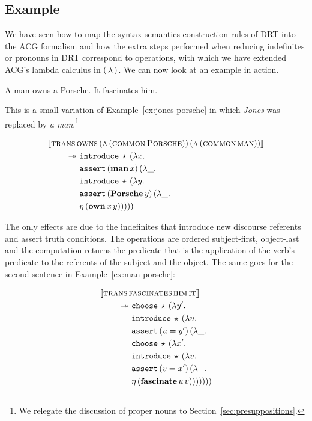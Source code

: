 \subsection{Example}
\label{ssec:dynamic-example}

We have seen how to map the syntax-semantics construction rules of DRT into
the ACG formalism and how the extra steps performed when reducing
indefinites or pronouns in DRT correspond to operations, with which we have
extended ACG's lambda calculus in $\llparenthesis \, \lambda \, \rrparenthesis$. We can now look at an
example in action.

\begin{exe}
  \ex \label{ex:man-porsche} A man owns a Porsche. It fascinates him.
\end{exe}

This is a small variation of Example~\ref{ex:jones-porsche} in which
\emph{Jones} was replaced by \emph{a man}.\footnote{We relegate the
  discussion of proper nouns to Section~\ref{sec:presuppositions}.}

\begin{align*}
  \llbracket \textsc{trans}\,&\textsc{owns}\,(\textsc{a}\,(\textsc{common}\,\textsc{Porsche}))\,(\textsc{a}\,(\textsc{common}\,\textsc{man})) \rrbracket \\
  \twoheadrightarrow &\ \mathtt{introduce}\,\star\,(\lambda x.\,  \\
       &\ \mathtt{assert}\,(\textbf{man}\,x)\,(\lambda \_.\,  \\
       &\ \mathtt{introduce}\,\star\,(\lambda y.\,  \\
       &\ \mathtt{assert}\,(\textbf{Porsche}\,y)\,(\lambda \_.\,  \\
       &\ \eta\,(\textbf{own}\,x\,y)))))
\end{align*}

The only effects are due to the indefinites that introduce new discourse
referents and assert truth conditions. The operations are ordered
subject-first, object-last and the computation returns the predicate that
is the application of the verb's predicate to the referents of the subject
and the object. The same goes for the second sentence in
Example~\ref{ex:man-porsche}:

\begin{align*}
  \llbracket \textsc{trans}\,&\textsc{fascinates}\,\textsc{him}\,\textsc{it} \rrbracket \\
  \twoheadrightarrow &\ \mathtt{choose}\,\star\,(\lambda y'.\,  \\
       &\ \mathtt{introduce}\,\star\,(\lambda u.\,  \\
       &\ \mathtt{assert}\,(u = y')\,(\lambda \_.\,  \\
       &\ \mathtt{choose}\,\star\,(\lambda x'.\,  \\
       &\ \mathtt{introduce}\,\star\,(\lambda v.\,  \\
       &\ \mathtt{assert}\,(v = x')\,(\lambda \_.\,  \\
       &\ \eta\,(\textbf{fascinate}\,u\,v)))))))
\end{align*}

